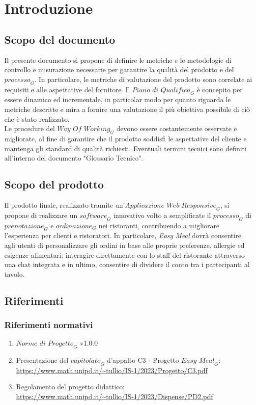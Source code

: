 \section{Introduzione}
\subsection{Scopo del documento}
Il presente documento si propone di definire le metriche e le metodologie di controllo e misurazione necessarie per garantire la qualità del prodotto e del $\textit{processo}_G$. In particolare, le metriche di valutazione del prodotto sono correlate ai requisiti e alle aspettative del fornitore.
Il $\textit{Piano di Qualifica}_G$ è concepito per essere dinamico ed incrementale, in particolar modo per quanto riguarda le metriche descritte e mira a fornire una valutazione il più obiettiva possibile di ciò che è stato realizzato.\\
Le procedure del $\textit{Way Of Working}_G$ devono essere costantemente osservate e migliorate, al fine di garantire che il prodotto soddisfi le aspettative del cliente e mantenga gli standard di qualità richiesti. Eventuali termini tecnici sono definiti all'interno del documento "Glossario Tecnico".
\subsection{Scopo del prodotto}
Il prodotto finale, realizzato tramite un'$\textit{Applicazione Web Responsive}_G$, si propone di realizzare un $\textit{software}_G$ innovativo volto a semplificate il $\textit{processo}_G$ di $\textit{prenotazione}_G$ e $\textit{ordinazione}_G$ nei ristoranti, contribuendo a migliorare l'esperienza per clienti e ristoratori. In particolare, \textit{Easy Meal} dovrà consentire agli utenti di personalizzare gli ordini in base alle proprie preferenze, allergie ed esigenze alimentari; interagire direttamente con lo staff del ristorante attraverso una chat integrata e in ultimo, consentire di dividere il conto tra i partecipanti al tavolo.
\subsection{Riferimenti}
\subsubsection{Riferimenti normativi}
\begin{enumerate}
    \item $\textit{Norme di Progetto}_G$ v1.0.0
    \item Presentazione del $\textit{capitolato}_G$ d'appalto C3 - Progetto $\textit{Easy Meal}_G$: \\ 
    \url{https://www.math.unipd.it/~tullio/IS-1/2023/Progetto/C3.pdf}
    \item Regolamento del progetto didattico: \\ 
    \url{https://www.math.unipd.it/~tullio/IS-1/2023/Dispense/PD2.pdf}
\end{enumerate}
